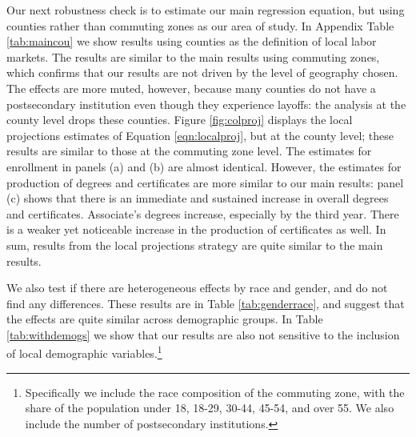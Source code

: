 Our next robustness check is to estimate our main regression equation, but using counties rather than commuting zones as our area of study. In Appendix Table \ref{tab:maincou} we show results using counties as the definition of local labor markets. The results are  similar to the main results using commuting zones, which confirms that our results are not driven by the level of geography chosen. The effects are more muted, however, because many counties do not have a postsecondary institution even though they experience layoffs: the analysis at the county level drops these counties. Figure \ref{fig:colproj} displays the local projections estimates of Equation \ref{eqn:localproj}, but at the county level; these results are similar to those at the commuting zone level. The estimates for enrollment in panels (a) and (b) are almost identical. However, the estimates for production of degrees and certificates are more similar to our main results: panel (c) shows that there is an immediate and sustained increase in overall degrees and certificates. Associate's degrees increase, especially by the third year. There is a weaker yet noticeable increase in the production of certificates as well. In sum, results from the local projections strategy are quite similar to the main results. 

We also test if there are heterogeneous effects by race and gender, and do not find any differences. These results are in Table \ref{tab:genderrace}, and suggest that the effects are quite similar across demographic groups. In Table \ref{tab:withdemogs} we show that our results are also not sensitive to the inclusion of local demographic variables.\footnote{Specifically we include the race composition of the commuting zone, with the share of the population under 18, 18-29, 30-44, 45-54, and over 55. We also include the number of postsecondary institutions.} 


